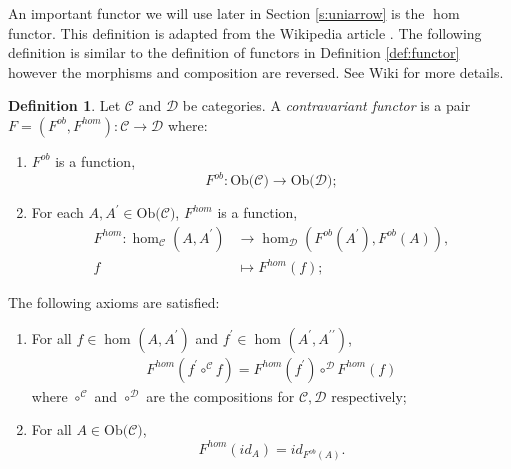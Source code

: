 \documentclass[11pt,a4paper]{article}
\theoremstyle{definition}
\newtheorem{definition}[thm]{Definition}
\newcommand\ho[3][]{\hom_{#1}(#2,#3)}
\newcommand\ob[1]{\mathrm{Ob(}#1\mathrm{)}}
\newcommand\cat[1]{\mathscr{#1}}
\numberwithin{equation}{section}
\begin{document}
An important functor we will use later in Section \ref{s:uniarrow} is the $\hom$ functor. This definition is adapted from the Wikipedia article \cite{wiki:homfunc}. The following definition is similar to the definition of functors in Definition \ref{def:functor} however the morphisms and composition are reversed. See Wiki \cite{wiki:functors} for more details.
\begin{definition}
\label{def:contrafunctor}
Let $\mathscr{C}$ and $\mathscr{D}$ be categories. A \emph{contravariant functor} is a pair
$F=(F^{ob},F^{hom})\colon \mathscr{C}\rightarrow\mathscr{D}$ where:
\begin{enumerate}
    \item $F^{ob}$ is a function,
    \[F^{ob}\colon \ob{\mathscr{C}}\rightarrow\ob{\mathscr{D}};\]
    \item For each $A,A^{\prime}\in\ob{\mathscr{C}}$, $F^{hom}$ is a function,
    \begin{align*}
        F^{hom}\colon \ho[\cat{C}]{A}{A^{\prime}} &\rightarrow\ho[\cat{D}]{F^{ob}(A^{\prime})}{F^{ob}(A)},\\
        f&\mapsto F^{hom}(f);
    \end{align*}
    \end{enumerate}
    The following axioms are satisfied:
    \begin{enumerate}
        \item For all $f\in\ho{A}{A^{\prime}}$ and $f^{\prime}\in\ho{A^{\prime}}{A^{\prime\prime}}$, 
        \begin{align*}
            F^{hom}(f^{\prime}\circ^{\mathscr{C}} f) = F^{hom}(f^{\prime})\circ^{\mathscr{D}} F^{hom}(f)
        \end{align*} 
        where $\circ^{\mathscr{C}}$ and $\circ^{\mathscr{D}}$ are the compositions for $\mathscr{C}, \mathscr{D}$ respectively;
        \item For all $A\in\ob{\mathscr{C}}$, 
        \[F^{hom}(id_{A}) = id_{F^{ob}(A)}.\]
    \end{enumerate}
\end{definition}
\end{document}
